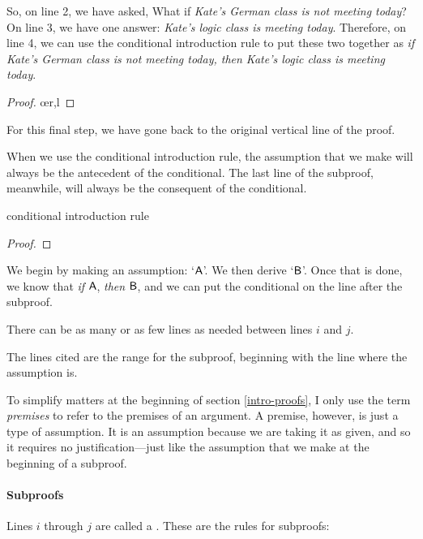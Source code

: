 So, on line 2, we have asked, What if \textit{Kate's German class is not meeting today}? On line 3, we have one answer: \textit{Kate's logic class is meeting today}. Therefore, on line 4, we can use the conditional introduction rule to put these two together as \textit{if Kate's German class is not meeting today, then Kate's logic class is meeting today}.
	\begin{proof}
		 \pr{}
		\open
			 \as{}
			\oe{r,l}
			\close
	\end{proof}
For this final step, we have gone back to the original vertical line of the proof. 

When we use the conditional introduction rule, the assumption that we make will always be the antecedent of the conditional. The last line of the subproof, meanwhile, will always be the consequent of the conditional.

\begin{factboxy}{conditional introduction rule}
	\begin{proof}
		\open
			 \as{}
		\close
	\end{proof}

\small{We begin by making an assumption: `$\mathsf{A}$'. We then derive `$\mathsf{B}$'. Once that is done, we know that \textit{if} $\mathsf{A}$, \textit{then} $\mathsf{B}$, and we can put the conditional on the line after the subproof.

There can be as many or as few lines as needed between lines $i$ and $j$.

The lines cited are the range for the subproof, beginning with the line where the assumption is.} 
\end{factboxy}


\begin{notebox}
To simplify matters at the beginning of section \ref{intro-proofs}, I only use the term \textit{premises} to refer to the premises of an argument. A premise, however, is just a type of assumption. It is an assumption because we are taking it as given, and so it requires no justification---just like the assumption that we make at the beginning of a subproof. 
\end{notebox}


\paragraph{Subproofs} Lines $i$ through $j$ are called a . These are the rules for subproofs:

